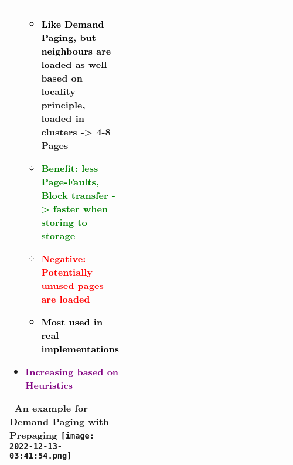 \documentclass[main.tex,fontsize=8pt,paper=a4,paper=portrait,DIV=calc,]{scrartcl}
\begin{document}
\begin{table}[ht!]
\begin{tabular}{|m{0.2\linewidth}|m{0.755\linewidth}|}
\begin{itemize}
  \begin{itemize}
  \item \textcolor{black}{Like Demand Paging, but neighbours are loaded as well}\newline
    based on locality principle, loaded in clusters -> 4-8 Pages
  \item \textcolor{green}{Benefit: less Page-Faults, Block transfer -> faster when storing to storage}
  \item \textcolor{red}{Negative: Potentially unused pages are loaded}
  \item \textcolor{black}{Most used in real implementations}
  \end{itemize} 
\item \textcolor{purple}{Increasing based on Heuristics}\newline
\vspace{-3mm}
\end{itemize} 
\, \newline
An example for \textbf{Demand Paging with Prepaging}\newline
\texttt{[image: 2022-12-13-03:41:54.png]}\\
\hline
\end{tabular}
\end{table}
\end{document}
